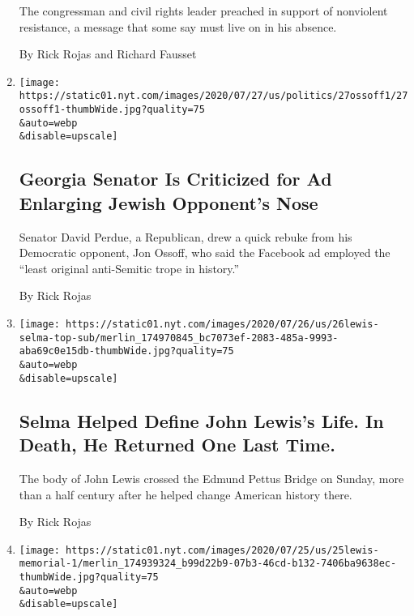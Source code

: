 \begin{enumerate}
  The congressman and civil rights leader preached in support of
  nonviolent resistance, a message that some say must live on in his
  absence.

  By Rick Rojas and Richard Fausset
\item
  \href{/2020/07/27/us/politics/jon-ossoff-david-perdue-ad.html}{}

  \texttt{[image: https://static01.nyt.com/images/2020/07/27/us/politics/27ossoff1/27ossoff1-thumbWide.jpg?quality=75\\\&auto=webp\\\&disable=upscale]}

  \hypertarget{georgia-senator-is-criticized-for-ad-enlarging-jewish-opponents-nose}{%
  \subsection{Georgia Senator Is Criticized for Ad Enlarging Jewish
  Opponent's
  Nose}\label{georgia-senator-is-criticized-for-ad-enlarging-jewish-opponents-nose}}

  Senator David Perdue, a Republican, drew a quick rebuke from his
  Democratic opponent, Jon Ossoff, who said the Facebook ad employed the
  ``least original anti-Semitic trope in history.''

  By Rick Rojas
\item
  \href{/2020/07/26/us/selma-john-lewis-memorial.html}{}

  \texttt{[image: https://static01.nyt.com/images/2020/07/26/us/26lewis-selma-top-sub/merlin\_174970845\_bc7073ef-2083-485a-9993-aba69c0e15db-thumbWide.jpg?quality=75\\\&auto=webp\\\&disable=upscale]}

  \hypertarget{selma-helped-define-john-lewiss-life-in-death-he-returned-one-last-time}{%
  \subsection{Selma Helped Define John Lewis's Life. In Death, He
  Returned One Last
  Time.}\label{selma-helped-define-john-lewiss-life-in-death-he-returned-one-last-time}}

  The body of John Lewis crossed the Edmund Pettus Bridge on Sunday,
  more than a half century after he helped change American history
  there.

  By Rick Rojas
\item
  \href{/2020/07/25/us/john-lewis-memorial-service.html}{}

  \texttt{[image: https://static01.nyt.com/images/2020/07/25/us/25lewis-memorial-1/merlin\_174939324\_b99d22b9-07b3-46cd-b132-7406ba9638ec-thumbWide.jpg?quality=75\\\&auto=webp\\\&disable=upscale]}


\end{enumerate}
